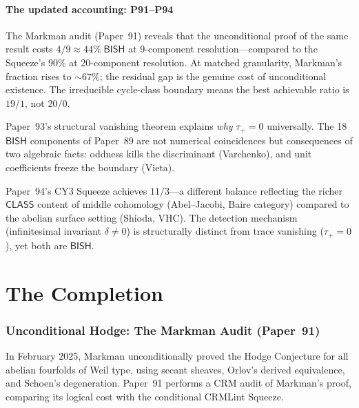 \documentclass[11pt]{article}
\theoremstyle{plain}
\theoremstyle{definition}
\theoremstyle{remark}
\newcommand{\BISH}{\mathsf{BISH}}
\newcommand{\CLASS}{\mathsf{CLASS}}
\begin{document}
\subsection{The updated accounting: P91--P94}

The Markman audit (Paper~91) reveals that the unconditional proof of the same result costs $4/9 \approx 44\%\;\BISH$ at 9-component resolution---compared to the Squeeze's $90\%$ at 20-component resolution.  At matched granularity, Markman's fraction rises to ${\sim}67\%$; the residual gap is the genuine cost of unconditional existence.  The irreducible cycle-class boundary means the best achievable ratio is $19/1$, not $20/0$.

Paper~93's structural vanishing theorem explains \emph{why} $\tau_+ = 0$ universally.  The 18~$\BISH$ components of Paper~89 are not numerical coincidences but consequences of two algebraic facts: oddness kills the discriminant (Varchenko), and unit coefficients freeze the boundary (Vieta).

Paper~94's CY3 Squeeze achieves $11/3$---a different balance reflecting the richer $\CLASS$ content of middle cohomology (Abel--Jacobi, Baire category) compared to the abelian surface setting (Shioda, VHC).  The detection mechanism (infinitesimal invariant $\delta \neq 0$) is structurally distinct from trace vanishing ($\tau_+ = 0$), yet both are $\BISH$.



\part{The Completion}\label{part:completion}

\section{Unconditional Hodge: The Markman Audit (Paper~91)}\label{sec:markman}

In February 2025, Markman \cite{markman} unconditionally proved the Hodge Conjecture for all abelian fourfolds of Weil type, using secant sheaves, Orlov's derived equivalence, and Schoen's degeneration.  Paper~91 \cite{p91} performs a CRM audit of Markman's proof, comparing its logical cost with the conditional CRMLint Squeeze.
\end{document}
